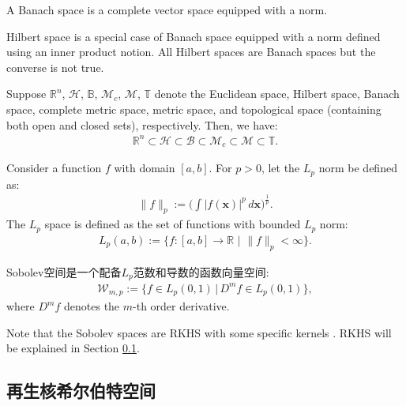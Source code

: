 \documentclass[lang=cn,10pt]{gorgeousnbook}
\numberwithin{equation}{section}%
\numberwithin{figure}{section}%
\begin{document}
\begin{definition}
A Banach space is a complete vector space equipped with a norm. 
\end{definition}


\begin{remark}
Hilbert space is a special case of Banach space equipped with a norm defined using an inner product notion. All Hilbert spaces are Banach spaces but the converse is not true. 
\end{remark}


Suppose $\mathbb{R}^n$, $\mathcal{H}$, $\mathbb{B}$, $\mathcal{M}_c$, $\mathcal{M}$, $\mathbb{T}$ denote the Euclidean space, Hilbert space, Banach space, complete metric space, metric space, and topological space (containing both open and closed sets), respectively. Then, we have:
\begin{align}
\mathbb{R}^n \subset \mathcal{H} \subset \mathcal{B} \subset \mathcal{M}_c \subset \mathcal{M} \subset \mathbb{T}.
\end{align}

\begin{definition}[$L_p$ Space]
Consider a function $f$ with domain $[a, b]$. 
For $p >0$, let the $L_p$ norm be defined as:
\begin{align}
\|f\|_p := \Big(\int |f(\boldsymbol{x})|^p\, d\boldsymbol{x}\Big)^{\frac{1}{p}}.
\end{align}
The $L_p$ space is defined as the set of functions with bounded $L_p$ norm:
\begin{align}
L_p(a,b) := \{f:[a,b] \rightarrow \mathbb{R}\,\, |\,\, \|f\|_p < \infty \}.
\end{align}
\end{definition}

\begin{definition}
Sobolev空间是一个配备$L_p$范数和导数的函数向量空间: 
\begin{align}
\mathcal{W}_{m,p} := \{f \in L_p(0,1)\, |\, D^m f \in L_p(0,1) \},
\end{align}
where $D^m f$ denotes the $m$-th order derivative. 
\end{definition}
Note that the Sobolev spaces are RKHS with some specific kernels \cite{novak2018reproducing}. RKHS will be explained in Section \ref{section_RKHS}.

\subsection{再生核希尔伯特空间}\label{section_RKHS}
\end{document}
